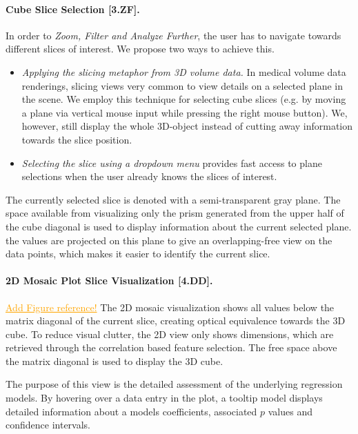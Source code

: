 \documentclass[journal]{style/vgtc} 			          %
\newcommand{\com}[1]{\textcolor{orange}{\uline{#1}}}
\begin{document}
\paragraph{Cube Slice Selection [3.ZF].}
In order to \emph{Zoom, Filter and Analyze Further}, the user has to navigate towards different slices of interest.
We propose two ways to achieve this.
\begin{itemize}
	\item \emph{Applying the slicing metaphor from 3D volume data.}
	In medical volume data renderings, slicing views very common to view details on a selected plane in the scene.
	We employ this technique for selecting cube slices (e.g. by moving a plane via vertical mouse input while pressing the right mouse button).
	We, however, still display the whole 3D-object instead of cutting away information towards the slice position.
	\item \emph{Selecting the slice using a dropdown menu} provides fast access to plane selections when the user already knows the slices of interest.
\end{itemize}
The currently selected slice is denoted with a semi-transparent gray plane.
The space available from visualizing only the prism generated from the upper half of the cube diagonal is used to display information about the current selected plane.
the values are projected on this plane to give an overlapping-free view on the data points, which makes it easier to identify the current slice.
\paragraph{2D Mosaic Plot Slice Visualization [4.DD].}
\com{Add Figure reference!}
The 2D mosaic visualization shows all values below the matrix diagonal of the current slice, creating optical equivalence towards the 3D cube.
To reduce visual clutter, the 2D view only shows dimensions, which are retrieved through the correlation based feature selection.
The free space above the matrix diagonal is used to display the 3D cube.

The purpose of this view is the detailed assessment of the underlying regression models.
By hovering over a data entry in the plot, a tooltip model displays detailed information about a models coefficients, associated $p$ values and confidence intervals.
\end{document}
